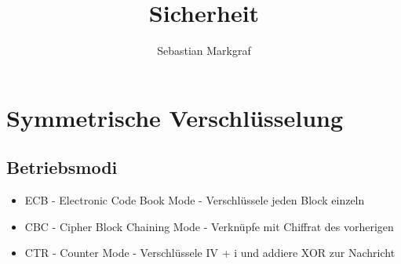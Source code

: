 \documentclass[10pt,a4paper]{article}
\author{Sebastian Markgraf}
\title{Sicherheit}
\begin{document}
	{\let\newpage\relax\maketitle}
	\tableofcontents
	\newpage
	\setcounter{page}{1}

	\section{Symmetrische Verschlüsselung}
        \subsection{Betriebsmodi}
        \begin{itemize}
        \item ECB - Electronic Code Book Mode - Verschlüssele jeden Block einzeln
        \item CBC - Cipher Block Chaining Mode - Verknüpfe mit Chiffrat des vorherigen
        \item CTR - Counter Mode - Verschlüssele IV + i und addiere XOR zur Nachricht
        \end{itemize}
\end{document}
